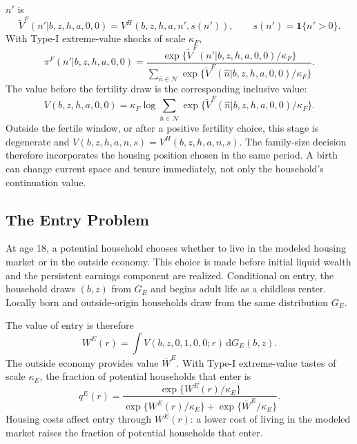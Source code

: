 \documentclass[11pt]{article}
\theoremstyle{definition}
\newcommand{\dd}{\mathrm d}
\newcommand{\1}{\mathbf 1}
\newcommand{\Nset}{\mathcal N}
\begin{document}
$n'$ is
\begin{equation}
\widetilde V^F(n'|b,z,h,a,0,0)
=
V^H(b,z,h,a,n',s(n')),
\qquad
s(n')=\1\{n'>0\}.
\label{eq:quant_fert_branch}
\end{equation}
With Type-I extreme-value shocks of scale $\kappa_F$,
\begin{equation}
\pi^F(n'|b,z,h,a,0,0)
=
\frac{\exp\{\widetilde V^F(n'|b,z,h,a,0,0)/\kappa_F\}}
{\sum_{\hat n\in\Nset}
\exp\{\widetilde V^F(\hat n|b,z,h,a,0,0)/\kappa_F\}}.
\label{eq:quant_fert_probs}
\end{equation}
The value before the fertility draw is the corresponding inclusive value:
\begin{equation}
V(b,z,h,a,0,0)
=
\kappa_F\log
\sum_{\hat n\in\Nset}
\exp\{\widetilde V^F(\hat n|b,z,h,a,0,0)/\kappa_F\}.
\label{eq:quant_fert_iv}
\end{equation}
Outside the fertile window, or after a positive fertility choice, this stage is
degenerate and $V(b,z,h,a,n,s)=V^H(b,z,h,a,n,s)$.
The family-size decision therefore incorporates the housing position chosen in
the same period. A birth can change current space and tenure immediately, not
only the household's continuation value.

\subsection{The Entry Problem}
\label{sec:quant_entry_problem}

At age 18, a potential household chooses whether to live in the modeled housing
market or in the outside economy. This choice is made before initial liquid
wealth and the persistent earnings component are realized. Conditional on entry, the household
draws $(b,z)$ from $G_E$ and begins adult life as a childless renter. Locally
born and outside-origin households draw from the same distribution $G_E$.

The value of entry is therefore
\[
W^E(r)=\int V(b,z,0,1,0,0;r)\,\dd G_E(b,z).
\]
The outside economy provides value $\bar W^E$. With Type-I extreme-value tastes
of scale $\kappa_E$, the fraction of potential households that enter is
\begin{equation}
q^E(r)
=
\frac{\exp\{W^E(r)/\kappa_E\}}
{\exp\{W^E(r)/\kappa_E\}+\exp\{\bar W^E/\kappa_E\}}.
\label{eq:quant_entry_probability}
\end{equation}
Housing costs affect entry through $W^E(r)$: a lower cost of living in the
modeled market raises the fraction of potential households that enter.
\end{document}
